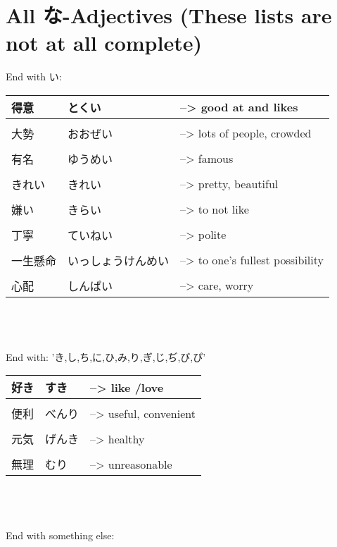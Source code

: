 \documentclass{article}
\begin{document}

\section{All な-Adjectives (These lists are not at all complete)}
End with い: \\
\begin{tabular}{ l | l l }
得意&とくい&--> good at and likes \\ \hline\\[-1em]
大勢 &おおぜい&--> lots of people, crowded\\ \hline\\[-1em]
有名 &ゆうめい&--> famous\\ \hline\\[-1em]
きれい &きれい&--> pretty, beautiful \\ \hline\\[-1em]
嫌い&きらい&--> to not like\\ \hline\\[-1em]
丁寧 &ていねい &--> polite\\ \hline\\[-1em]
一生懸命&いっしょうけんめい&--> to one’s fullest possibility\\ \hline\\[-1em]
心配&しんぱい&--> care, worry %
\end{tabular} \\ \\ \\
End with: 'き,し,ち,に,ひ,み,り,ぎ,じ,ぢ,び,ぴ' \\
\begin{tabular}{ l | l l }
好き&すき&--> like /love\\ \hline\\[-1em]
便利&べんり&--> useful, convenient\\ \hline\\[-1em]
元気&げんき&--> healthy\\ \hline\\[-1em]
無理 	&むり 	&--> unreasonable %
\end{tabular} \\ \\ \\
End with something else: \\
\end{document}
